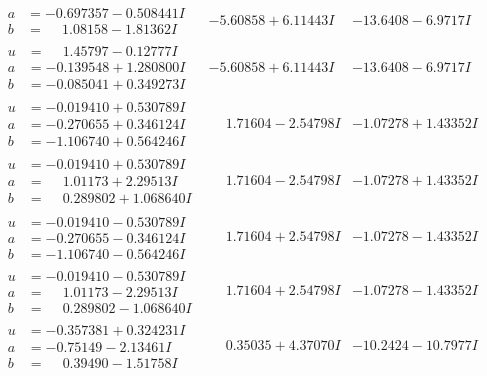 \documentclass[1p]{elsarticle_modified}
\theoremstyle{definition}
\begin{document}
$$\begin{array}{c|c|c}
\begin{aligned}
a &= -0.697357 - 0.508441 I \\
b &= \phantom{-}1.08158 - 1.81362 I\end{aligned}
 & -5.60858 + 6.11443 I & -13.6408 - 6.9717 I \\ \hline\begin{aligned}
u &= \phantom{-}1.45797 - 0.12777 I \\
a &= -0.139548 + 1.280800 I \\
b &= -0.085041 + 0.349273 I\end{aligned}
 & -5.60858 + 6.11443 I & -13.6408 - 6.9717 I \\ \hline\begin{aligned}
u &= -0.019410 + 0.530789 I \\
a &= -0.270655 + 0.346124 I \\
b &= -1.106740 + 0.564246 I\end{aligned}
 & \phantom{-}1.71604 - 2.54798 I & -1.07278 + 1.43352 I \\ \hline\begin{aligned}
u &= -0.019410 + 0.530789 I \\
a &= \phantom{-}1.01173 + 2.29513 I \\
b &= \phantom{-}0.289802 + 1.068640 I\end{aligned}
 & \phantom{-}1.71604 - 2.54798 I & -1.07278 + 1.43352 I \\ \hline\begin{aligned}
u &= -0.019410 - 0.530789 I \\
a &= -0.270655 - 0.346124 I \\
b &= -1.106740 - 0.564246 I\end{aligned}
 & \phantom{-}1.71604 + 2.54798 I & -1.07278 - 1.43352 I \\ \hline\begin{aligned}
u &= -0.019410 - 0.530789 I \\
a &= \phantom{-}1.01173 - 2.29513 I \\
b &= \phantom{-}0.289802 - 1.068640 I\end{aligned}
 & \phantom{-}1.71604 + 2.54798 I & -1.07278 - 1.43352 I \\ \hline\begin{aligned}
u &= -0.357381 + 0.324231 I \\
a &= -0.75149 - 2.13461 I \\
b &= \phantom{-}0.39490 - 1.51758 I\end{aligned}
 & \phantom{-}0.35035 + 4.37070 I & -10.2424 - 10.7977 I \\ \hline\begin{aligned}

\end{aligned}
\end{array}$$
\end{document}
